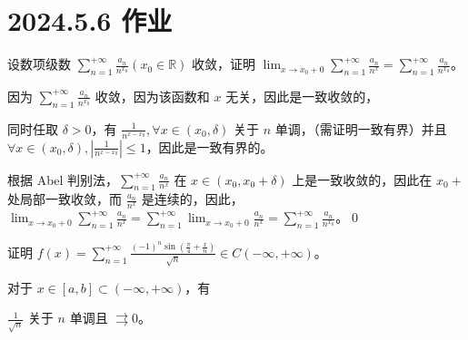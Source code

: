 \ifx\allfiles\undefined

\date{}
\author{尹锦润}

\maketitle
\fi

\section{2024.5.6 作业}
\begin{ques}
	设数项级数 $\displaystyle \sum _{n=1}^{+\infty }\frac{a_{n}}{n^{x_{0}}}( x_{0} \in \mathbb{R})$ 收敛，证明 $\displaystyle \lim _{x\rightarrow x_{0} +0}\sum _{n=1}^{+\infty }\frac{a_{n}}{n^{x}} =\sum _{n=1}^{+\infty }\frac{a_{n}}{n^{x_{0}}}$。
\end{ques}



因为 $\displaystyle \sum _{n=1}^{+\infty }\frac{a_{n}}{n^{x_{0}}}$ 收敛，因为该函数和 $\displaystyle x$ 无关，因此是一致收敛的，

同时任取 $\displaystyle \delta  >0$，有 $\displaystyle \frac{1}{n^{x-x_{0}}} ,\forall x\in ( x_{0} ,\delta )$ 关于 $\displaystyle n$ 单调，（需证明一致有界）并且 $\displaystyle \forall x\in ( x_{0} ,\delta ) ,\left| \frac{1}{n^{x-x_{0}}}\right| \leqslant 1$，因此是一致有界的。

根据 Abel 判别法，$\displaystyle \sum _{n=1}^{+\infty }\frac{a_{n}}{n^{x}}$ 在 $\displaystyle x\in ( x_{0} ,x_{0} +\delta )$ 上是一致收敛的，因此在 $\displaystyle x_{0} +$ 处局部一致收敛，而 $\displaystyle \frac{a_{n}}{n^{x}}$ 是连续的，因此，$\displaystyle \lim _{x\rightarrow x_{0} +0}\sum _{n=1}^{+\infty }\frac{a_{n}}{n^{x}} =\sum _{n=1}^{+\infty }\lim _{x\rightarrow x_{0} +0}\frac{a_{n}}{n^{x}} =\sum _{n=1}^{+\infty }\frac{a_{n}}{n^{x_{0}}}$。\qed 





\begin{ques}
	证明 $\displaystyle f( x) =\sum _{n=1}^{+\infty }\frac{( -1)^{n}\sin\left(\frac{\pi }{4} +\frac{x}{n}\right)}{\sqrt{n}} \in C( -\infty ,+\infty )$。
\end{ques}





对于 $\displaystyle x\in [ a,b] \subset ( -\infty ,+\infty )$，有

$\displaystyle \frac{1}{\sqrt{n}}$ 关于 $\displaystyle n$ 单调且 $\displaystyle \rightrightarrows 0$。


